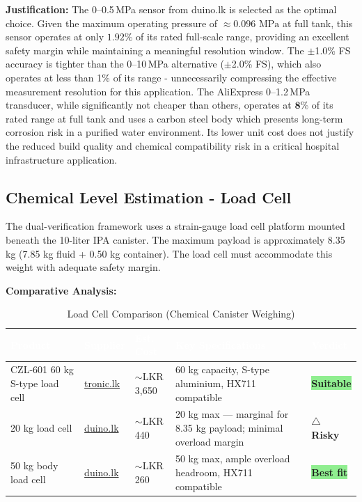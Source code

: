 \documentclass[12pt,a4paper]{article}
\newcommand{\badgegreen}[1]{%
  \colorbox{lightgreen}{\textcolor{badgegreen}{\footnotesize\textbf{#1}}}%
}
\newcommand{\badgered}[1]{%
  \colorbox{lightred}{\textcolor{badgered}{\footnotesize\textbf{#1}}}%
}
\begin{document}
\noindent\textbf{Justification:} The 0--0.5\,MPa sensor from duino.lk is selected as the optimal choice. Given the maximum operating pressure of $\approx 0.096\text{ MPa}$ at full tank, this sensor operates at only $\mathbf{1.92\%}$ of its rated full-scale range, providing an excellent safety margin while maintaining a meaningful resolution window. The $\pm$1.0\% FS accuracy is tighter than the 0--10\,MPa alternative ($\pm$2.0\% FS), which also operates at less than 1\% of its range - unnecessarily compressing the effective measurement resolution for this application. The AliExpress 0--1.2\,MPa transducer, while significantly not cheaper than others, operates at $\mathbf{8\%}$ of its rated range at full tank and uses a carbon steel body which presents long-term corrosion risk in a purified water environment. Its lower unit cost does not justify the reduced build quality and chemical compatibility risk in a critical hospital infrastructure application.
\subsection{Chemical Level Estimation - Load Cell}

The dual-verification framework uses a strain-gauge load cell platform mounted beneath the 10-liter IPA canister. The maximum payload is approximately 8.35 kg (7.85 kg fluid + 0.50 kg container). The load cell must accommodate this weight with adequate safety margin.

\vspace{0.3cm}
\noindent\textbf{Comparative Analysis:}

\begin{table}[H]
\centering
\setlength{\tabcolsep}{5pt}
\renewcommand{\arraystretch}{1.4}
\begin{tabular}{|p{3.2cm}|p{3.5cm}|p{2.2cm}|p{3.5cm}|p{2cm}|}
\hline
\rowcolor{headerblue}
\textcolor{white}{\textbf{Product}} &
\textcolor{white}{\textbf{Supplier}} &
\textcolor{white}{\textbf{Est. Cost}} &
\textcolor{white}{\textbf{Key Specifications}} &
\textcolor{white}{\textbf{Verdict}} \\
\hline
CZL-601 60 kg S-type load cell &
\href{https://tronic.lk/product/czl-601-load-cell-60kg-130x30x22mm}{tronic.lk} &
$\sim$LKR 3,650 &
60 kg capacity, S-type aluminium, HX711 compatible &
\badgegreen{Suitable} \\
\hline
20 kg load cell &
\href{https://www.duino.lk/product/20kg-load-cell-weighing-sensor/}{duino.lk} &
$\sim$LKR 440 &
20 kg max — marginal for 8.35 kg payload; minimal overload margin &
\badgered{$\triangle$ Risky} \\
\hline
\rowcolor{chosen}
50 kg body load cell &
\href{https://www.duino.lk/product/50kg-body-load-cell/}{duino.lk} &
$\sim$LKR 260 &
50 kg max, ample overload headroom, HX711 compatible &
\badgegreen{Best fit} \\
\hline
\end{tabular}
\caption{Load Cell Comparison (Chemical Canister Weighing)}
\end{table}
\end{document}
